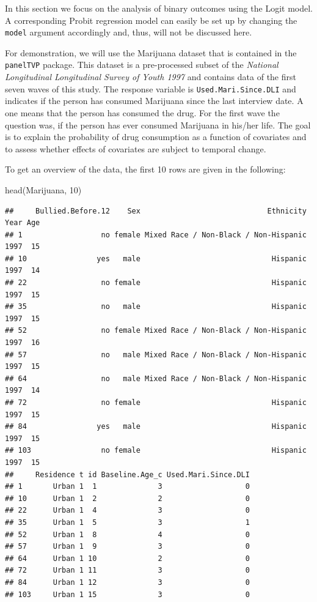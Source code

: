 \documentclass[a4paper, preprint, 3p,
authoryear]{elsarticle} %
\newenvironment{Shaded}{\begin{snugshade}}{\end{snugshade}}
\newcommand{\NormalTok}[1]{#1}
\begin{document}
In this section we focus on the analysis of binary outcomes using the
Logit model. A corresponding Probit regression model can easily be set
up by changing the \texttt{model} argument accordingly and, thus, will
not be discussed here.

For demonstration, we will use the Marijuana dataset that is contained
in the \texttt{panelTVP} package. This dataset is a pre-processed subset
of the \textit{National Longitudinal Longitudinal Survey of Youth 1997}
and contains data of the first seven waves of this study. The response
variable is \texttt{Used.Mari.Since.DLI} and indicates if the person has
consumed Marijuana since the last interview date. A one means that the
person has consumed the drug. For the first wave the question was, if
the person has ever consumed Marijuana in his/her life. The goal is to
explain the probability of drug consumption as a function of covariates
and to assess whether effects of covariates are subject to temporal
change.

To get an overview of the data, the first 10 rows are given in the
following:

\begin{Shaded}
\begin{Highlighting}[]
\NormalTok{head(Marijuana, 10)}
\end{Highlighting}
\end{Shaded}

\begin{verbatim}
##     Bullied.Before.12    Sex                             Ethnicity Year Age
## 1                  no female Mixed Race / Non-Black / Non-Hispanic 1997  15
## 10                yes   male                              Hispanic 1997  14
## 22                 no female                              Hispanic 1997  15
## 35                 no   male                              Hispanic 1997  15
## 52                 no female Mixed Race / Non-Black / Non-Hispanic 1997  16
## 57                 no   male Mixed Race / Non-Black / Non-Hispanic 1997  15
## 64                 no   male Mixed Race / Non-Black / Non-Hispanic 1997  14
## 72                 no female                              Hispanic 1997  15
## 84                yes   male                              Hispanic 1997  15
## 103                no female                              Hispanic 1997  15
##     Residence t id Baseline.Age_c Used.Mari.Since.DLI
## 1       Urban 1  1              3                   0
## 10      Urban 1  2              2                   0
## 22      Urban 1  4              3                   0
## 35      Urban 1  5              3                   1
## 52      Urban 1  8              4                   0
## 57      Urban 1  9              3                   0
## 64      Urban 1 10              2                   0
## 72      Urban 1 11              3                   0
## 84      Urban 1 12              3                   0
## 103     Urban 1 15              3                   0
\end{verbatim}
\end{document}
